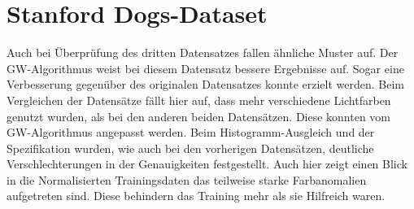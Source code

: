   \section{Stanford Dogs-Dataset}
Auch bei Überprüfung des dritten Datensatzes fallen ähnliche Muster auf. Der GW-Algorithmus weist bei diesem Datensatz bessere Ergebnisse auf. Sogar eine Verbesserung gegenüber des originalen Datensatzes konnte erzielt werden. Beim Vergleichen der Datensätze fällt hier auf, dass mehr verschiedene Lichtfarben genutzt wurden, als bei den anderen beiden Datensätzen. Diese konnten vom GW-Algorithmus angepasst werden. Beim Histogramm-Ausgleich und der Spezifikation wurden, wie auch bei den vorherigen Datensätzen, deutliche Verschlechterungen in der Genauigkeiten festgestellt. Auch hier zeigt einen Blick in die Normalisierten Trainingsdaten das teilweise starke Farbanomalien aufgetreten sind. Diese behindern das Training mehr als sie Hilfreich waren.  
